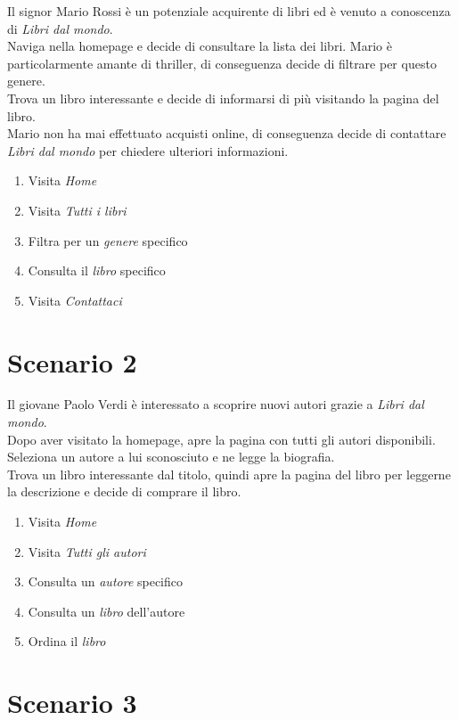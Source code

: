 \documentclass[12pt,a4paper,oneside]{report}
\begin{document}
Il signor Mario Rossi è un potenziale acquirente di libri ed è venuto a conoscenza di \textit{Libri dal mondo}. \\ 
Naviga nella homepage e decide di consultare la lista dei libri. Mario è particolarmente amante di thriller, di conseguenza decide di filtrare per questo genere. \\
Trova un libro interessante e decide di informarsi di più visitando la pagina del libro. \\
Mario non ha mai effettuato acquisti online, di conseguenza decide di contattare \textit{Libri dal mondo} per chiedere ulteriori informazioni.

\begin{enumerate}
	\item Visita \textit{Home}
	\item Visita \textit{Tutti i libri}
	\item Filtra per un \textit{genere} specifico
	\item Consulta il \textit{libro} specifico
	\item Visita \textit{Contattaci}
\end{enumerate}

\section{Scenario 2}

Il giovane Paolo Verdi è interessato a scoprire nuovi autori grazie a \textit{Libri dal mondo}.\\ 
Dopo aver visitato la homepage, apre la pagina con tutti gli autori disponibili. Seleziona un autore a lui sconosciuto e ne legge la biografia. \\
Trova un libro interessante dal titolo, quindi apre la pagina del libro per leggerne la descrizione e decide di comprare il libro.

\begin{enumerate}
	\item Visita \textit{Home}
	\item Visita \textit{Tutti gli autori}
	\item Consulta un \textit{autore} specifico
	\item Consulta un \textit{libro} dell'autore
	\item Ordina il \textit{libro}
\end{enumerate}

\section{Scenario 3}
\end{document}
